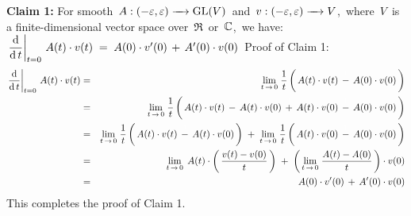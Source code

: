 \proof
\vskip 0.3cm
\noindent
\textbf{Claim 1:}\;
For smooth 
\,$A : (-\varepsilon,\varepsilon) \xrightarrow{{\color{white}....}} \GL(V)$\,
and
\,$v : (-\varepsilon,\varepsilon) \xrightarrow{{\color{white}....}} V$,\,
where \,$V$\, is a finite-dimensional vector space over \,$\Re$\, or \,$\mathbb{C}$,\,
we have:
\,$
\left.\dfrac{\textnormal{d}}{\textnormal{d}\,t}\right\vert_{t=0}\,A(t) \cdot v(t)
\; = \;
    A(0) \cdot v^{\prime}(0)
    \, + \,
    A^{\prime}(0) \cdot v(0)
$\,
\vskip 0.1cm
\noindent
Proof of Claim 1:\;\;
\begin{eqnarray*}
\left.\dfrac{\d}{\d\,t}\right\vert_{t=0}\,A(t) \cdot v(t)
& = &
    \underset{t\,\rightarrow\,0}{\lim}\;
    \dfrac{1}{t}
    \left(\,
        A(t) \cdot v(t)
        \, \overset{{\color{white}1}}{-} \,
        A(0) \cdot v(0)
        \,\right)
\\
& = &
    \underset{t\,\rightarrow\,0}{\lim}\;
    \dfrac{1}{t}
    \left(\,
        A(t) \cdot v(t)
        \, \overset{{\color{white}1}}{-} \,
        A(t) \cdot v(0)
        \, \overset{{\color{white}1}}{+} \,
        A(t) \cdot v(0)
        \, \overset{{\color{white}1}}{-} \,
        A(0) \cdot v(0)
        \,\right)
\\
& = &
    \underset{t\,\rightarrow\,0}{\lim}\;
    \dfrac{1}{t}
    \left(\,
        A(t) \cdot v(t)
        \, \overset{{\color{white}1}}{-} \,
        A(t) \cdot v(0)
        \,\right)
    \; + \;
    \underset{t\,\rightarrow\,0}{\lim}\;
    \dfrac{1}{t}
    \left(\,
        A(t) \cdot v(0)
        \, \overset{{\color{white}1}}{-} \,
        A(0) \cdot v(0)
        \,\right)
\\
& = &
    \underset{t\,\rightarrow\,0}{\lim}\;\,
    A(t) \cdot 
    \left(\,
        \dfrac{v(t) - v(0)}{t}
        \,\right)
    \; + \;
    \left(\,
        \underset{t\,\rightarrow\,0}{\lim}\;
        \dfrac{A(t) - A(0)}{t}
        \,\right)
    \cdot
    v(0)
\\
& = &
    A(0) \cdot v^{\prime}(0)
    \, + \,
    A^{\prime}(0) \cdot v(0)
\end{eqnarray*}
This completes the proof of Claim 1.

